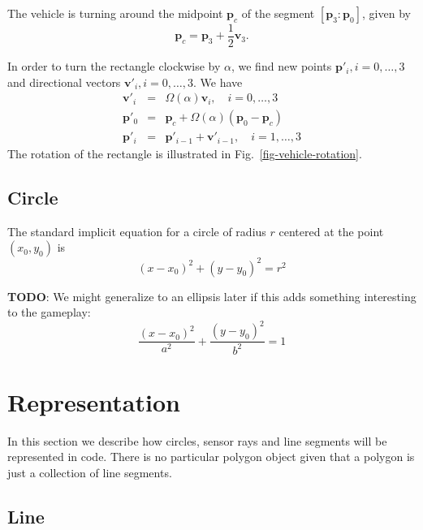 \documentclass[11pt]{article}
\newcommand{\pb}{\mathbf{p}}
\newcommand{\vb}{\mathbf{v}}
\newcommand{\figref}[1]{Fig.~\eqref{#1}}
\newcommand{\TODO}{{\bf TODO}}
\begin{document}
The vehicle is turning around the midpoint $\pb_c$ of the segment
$[\pb_3:\pb_0]$, given by
\begin{equation*}
    \pb_c = \pb_3 + \frac{1}{2}\vb_3.
\end{equation*}

In order to turn the rectangle clockwise by $\alpha$, we find new points
$\pb'_i,i=0,\ldots,3$ and directional vectors $\vb'_i,i=0,\ldots,3$.
We have
\begin{eqnarray}
    \vb'_i &=& \Omega(\alpha)\vb_i,\quad i=0,\ldots,3 \\
    \pb'_0 &=& \pb_c + \Omega(\alpha)(\pb_0 - \pb_c) \\
    \pb'_i &=& \pb'_{i-1} + \vb'_{i-1},\quad i=1,\ldots,3
\end{eqnarray}
The rotation of the rectangle is illustrated in \figref{fig-vehicle-rotation}.

\subsection{Circle}
\label{sec-circle}

The standard implicit equation for a circle of radius $r$  centered at the
point $(x_0, y_0)$ is
\begin{equation}
    (x - x_0)^2 + (y - y_0)^2 = r^2\label{eq-circle}
\end{equation}

\TODO: We might generalize to an ellipsis later if this adds something
interesting to the gameplay:
\begin{equation}
    \frac{(x-x_0)^2}{a^2} + \frac{(y-y_0)^2}{b^2} = 1
\end{equation}

\section{Representation}
\label{sec-representation}
In this section we describe how circles, sensor rays and line segments will be
represented in code. There is no particular polygon object given that a
polygon is just a collection of line segments.

\subsection{Line}
\label{sec-representation-line}
\end{document}

